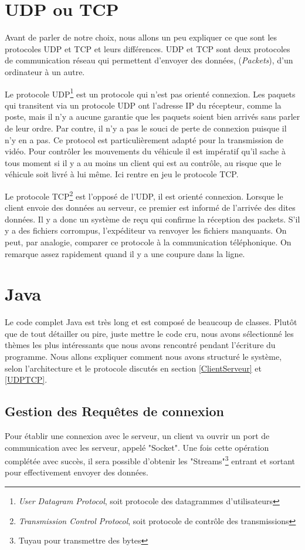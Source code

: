 \documentclass[a4paper,11pt]{report}
\begin{document}
{\section{UDP ou TCP\label{UDPTCP}}
Avant de parler de notre choix, nous allons un peu expliquer ce que sont les protocoles UDP et TCP et leurs différences. UDP et TCP sont deux protocoles de communication réseau qui permettent d'envoyer des données, (\textit{Packets}), d'un ordinateur à un autre.

Le protocole UDP\footnote{\textit{User Datagram Protocol}, soit protocole des datagrammes d'utilisateurs} est un protocole qui n'est pas orienté connexion. Les paquets qui transitent via un protocole UDP ont l'adresse IP du récepteur, comme la poste, mais il n'y a aucune garantie que les paquets soient bien arrivés sans parler de leur ordre. Par contre, il n'y a pas le souci de perte de connexion puisque il n'y en a pas. Ce protocol est particulièrement adapté pour la transmission de vidéo. Pour contrôler les mouvements du véhicule il est impératif qu'il sache à tous moment si il y a au moins un client qui est au contrôle, au risque que le véhicule soit livré à lui même. Ici rentre en jeu le protocole TCP. 

Le protocole TCP\footnote{\textit{Transmission Control Protocol}, soit protocole de contrôle des transmissions} est l'opposé de l'UDP, il est orienté connexion. Lorsque le client envoie des données au serveur, ce premier est informé de l'arrivée des dites données. Il y a donc un système de reçu qui confirme la réception des packets. S'il y a des fichiers corrompus, l'expéditeur va renvoyer les fichiers manquants. On peut, par analogie, comparer ce protocole à la communication téléphonique. On remarque assez rapidement quand il y a une coupure dans la ligne.\\

\section{Java}
Le code complet Java est très long et est composé de beaucoup de classes. Plutôt que de tout détailler ou pire, juste mettre le code cru, nous avons sélectionné les thèmes les plus intéressants que nous avons rencontré pendant l'écriture du programme. Nous allons expliquer comment nous avons structuré le système, selon l'architecture et le protocole discutés en section \ref{ClientServeur} et \ref{UDPTCP}.

\subsection{Gestion des Requêtes de connexion}
Pour établir une connexion avec le serveur, un client va ouvrir un port de communication avec les serveur, appelé "Socket". Une fois cette opération complétée avec succès, il sera possible d'obtenir les "Streams"\footnote{Tuyau pour transmettre des bytes} entrant et sortant pour effectivement envoyer des données.

}
\end{document}
